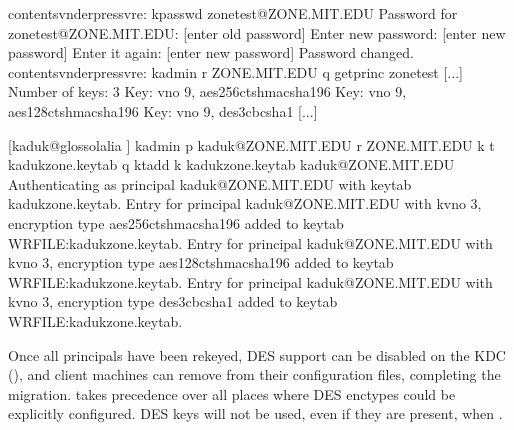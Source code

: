 \documentclass[letterpaper,10pt,english]{sphinxmanual}
\begin{document}
\begin{sphinxVerbatim}[commandchars=\\\{\}]
contents\PYGZhy{}vnder\PYGZhy{}pressvre:\PYGZti{}\PYGZgt{} kpasswd zonetest@ZONE.MIT.EDU
Password for zonetest@ZONE.MIT.EDU:  [enter old password]
Enter new password:                  [enter new password]
Enter it again:                      [enter new password]
Password changed.
contents\PYGZhy{}vnder\PYGZhy{}pressvre:\PYGZti{}\PYGZgt{} kadmin \PYGZhy{}r ZONE.MIT.EDU \PYGZhy{}q \PYGZsq{}getprinc zonetest\PYGZsq{}
[...]
Number of keys: 3
Key: vno 9, aes256\PYGZhy{}cts\PYGZhy{}hmac\PYGZhy{}sha1\PYGZhy{}96
Key: vno 9, aes128\PYGZhy{}cts\PYGZhy{}hmac\PYGZhy{}sha1\PYGZhy{}96
Key: vno 9, des3\PYGZhy{}cbc\PYGZhy{}sha1
[...]

[kaduk@glossolalia \PYGZti{}]\PYGZdl{} kadmin \PYGZhy{}p kaduk@ZONE.MIT.EDU \PYGZhy{}r ZONE.MIT.EDU \PYGZhy{}k \PYGZbs{}
\PYGZgt{} \PYGZhy{}t kaduk\PYGZhy{}zone.keytab \PYGZhy{}q \PYGZsq{}ktadd \PYGZhy{}k kaduk\PYGZhy{}zone.keytab kaduk@ZONE.MIT.EDU\PYGZsq{}
Authenticating as principal kaduk@ZONE.MIT.EDU with keytab kaduk\PYGZhy{}zone.keytab.
Entry for principal kaduk@ZONE.MIT.EDU with kvno 3, encryption type aes256\PYGZhy{}cts\PYGZhy{}hmac\PYGZhy{}sha1\PYGZhy{}96 added to keytab WRFILE:kaduk\PYGZhy{}zone.keytab.
Entry for principal kaduk@ZONE.MIT.EDU with kvno 3, encryption type aes128\PYGZhy{}cts\PYGZhy{}hmac\PYGZhy{}sha1\PYGZhy{}96 added to keytab WRFILE:kaduk\PYGZhy{}zone.keytab.
Entry for principal kaduk@ZONE.MIT.EDU with kvno 3, encryption type des3\PYGZhy{}cbc\PYGZhy{}sha1 added to keytab WRFILE:kaduk\PYGZhy{}zone.keytab.
\end{sphinxVerbatim}

\sphinxAtStartPar
Once all principals have been re\sphinxhyphen{}keyed, DES support can be disabled on the
KDC (), and client machines can remove
 from their {\hyperref[\detokenize{admin/conf_files/krb5_conf:krb5-conf-5}]{}} configuration
files, completing the migration.   takes precedence over
all places where DES enctypes could be explicitly configured.  DES keys will
not be used, even if they are present, when .
\end{document}
